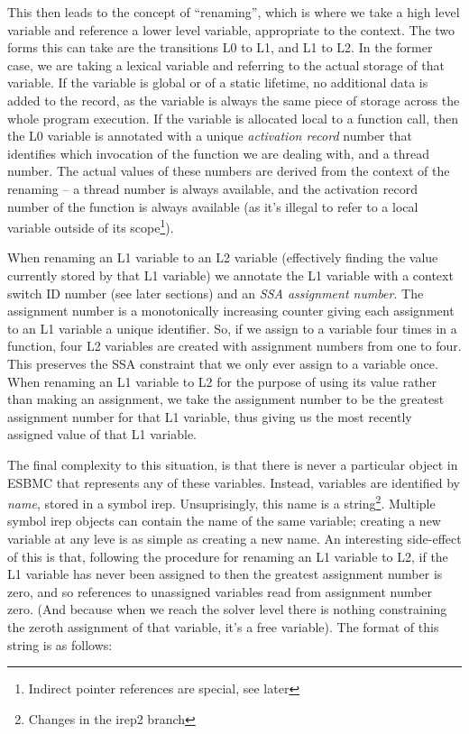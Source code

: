 \documentclass{article}
\begin{document}
This then leads to the concept of ``renaming'', which is where we take a high
level variable and reference a lower level variable, appropriate to the context.
The two forms this can take are the transitions L0 to L1, and L1 to L2. In the
former case, we are taking a lexical variable and referring to the actual
storage of that variable. If the variable is global or of a static lifetime,
no additional data is added to the record, as the variable is always the
same piece of storage across the whole program execution. If the variable is
allocated local to a function call, then the L0 variable is annotated with
a unique \textit{activation record} number that identifies which invocation
of the function we are dealing with, and a thread number. The actual values
of these numbers are derived from the context of the renaming -- a thread number
is always available, and the activation record number of the function is always
available (as it's illegal to refer to a local variable outside of its
scope\footnote{Indirect pointer references are special, see later}).


When renaming an L1 variable to an L2 variable (effectively finding the value
currently stored by that L1 variable) we annotate the L1 variable with
a context switch ID number (see later sections) and an \textit{SSA assignment
number}. The assignment number is a monotonically increasing counter giving each
assignment to an L1 variable a unique identifier. So, if we assign to a
variable four times in a function, four L2 variables are created with
assignment numbers from one to four. This preserves the SSA constraint that we
only ever assign to a variable once. When renaming an L1 variable to L2 for the
purpose of using its value rather than making an assignment, we take the
assignment number to be the greatest assignment number for that L1 variable,
thus giving us the most recently assigned value of that L1 variable.

The final complexity to this situation, is that there is never a particular
object in ESBMC that represents any of these variables. Instead, variables
are identified by \textit{name}, stored in a symbol irep. Unsuprisingly, this
name is a string\footnote{Changes in the irep2 branch}. Multiple symbol irep
objects can contain the name of the same variable; creating a new variable
at any leve is as simple as creating a new name. An interesting side-effect
of this is that, following the procedure for renaming an L1 variable to L2,
if the L1 variable has never been assigned to then the greatest assignment
number is zero, and so references to unassigned variables read from assignment
number zero. (And because when we reach the solver level there is nothing
constraining the zeroth assignment of that variable, it's a free variable).
The format of this string is as follows:
\end{document}
